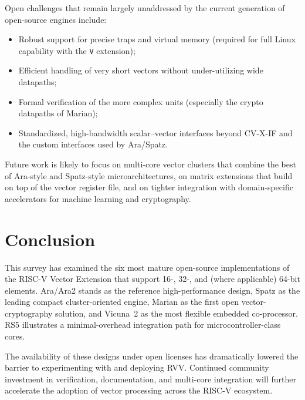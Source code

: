 \documentclass[11pt,a4paper]{article}
\begin{document}
Open challenges that remain largely unaddressed by the current generation of open-source engines include:

\begin{itemize}
  \item Robust support for precise traps and virtual memory (required for full Linux capability with the \texttt{V} extension);
  \item Efficient handling of very short vectors without under-utilizing wide datapaths;
  \item Formal verification of the more complex units (especially the crypto datapaths of Marian);
  \item Standardized, high-bandwidth scalar--vector interfaces beyond CV-X-IF and the custom interfaces used by Ara/Spatz.
\end{itemize}

Future work is likely to focus on multi-core vector clusters that combine the best of Ara-style and Spatz-style microarchitectures, on matrix extensions that build on top of the vector register file, and on tighter integration with domain-specific accelerators for machine learning and cryptography.

\section{Conclusion}

This survey has examined the six most mature open-source implementations of the RISC-V Vector Extension that support 16-, 32-, and (where applicable) 64-bit elements. Ara/Ara2 stands as the reference high-performance design, Spatz as the leading compact cluster-oriented engine, Marian as the first open vector-cryptography solution, and Vicuna~2 as the most flexible embedded co-processor. RS5 illustrates a minimal-overhead integration path for microcontroller-class cores.

The availability of these designs under open licenses has dramatically lowered the barrier to experimenting with and deploying RVV. Continued community investment in verification, documentation, and multi-core integration will further accelerate the adoption of vector processing across the RISC-V ecosystem.
\end{document}
